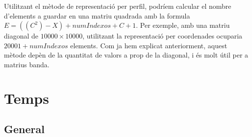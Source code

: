 \documentclass[11pt,a4paper,twoside]{report}
\begin{document}
Utilitzant el mètode de representació per perfil, podríem calcular el nombre d'elements a guardar en una matriu quadrada  amb la formula $E=((C^2)-X)+numIndexos+C+1$.
Per exemple, amb una matriu diagonal de $10000 \times 10000$, utilitzant la representació per coordenades ocuparia $20001+numIndexos$ elements. Com ja hem explicat anteriorment, aquest mètode depèn de la quantitat de valors a prop de la diagonal, i és molt útil per a matrius banda.

\section{Temps}

\subsection{General}




\end{document}
